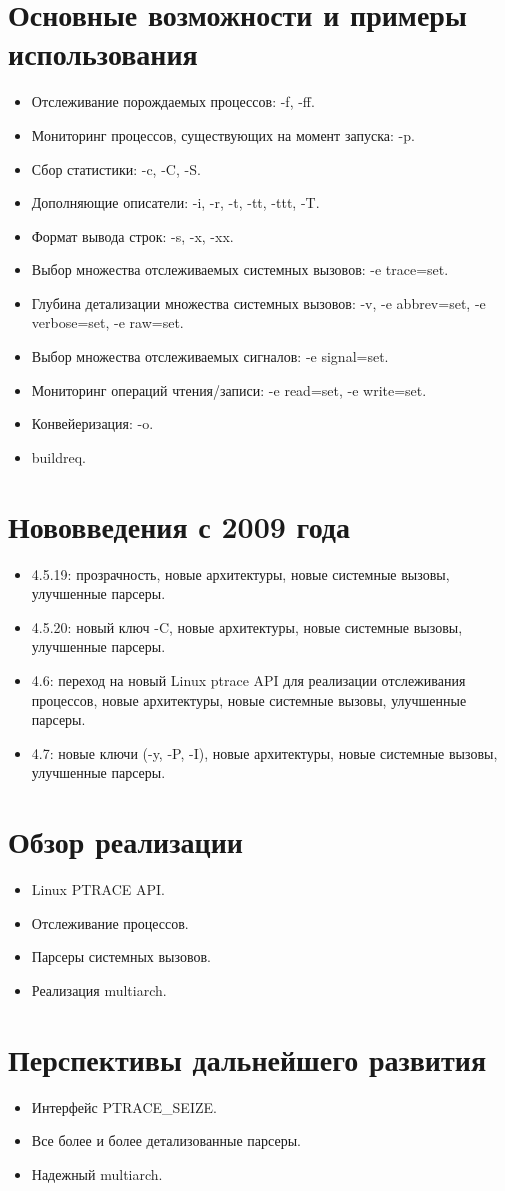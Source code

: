 \section*{Основные возможности и примеры использования}
\begin{itemize}
\item Отслеживание порождаемых процессов: -f, -ff.
\item Мониторинг процессов, существующих на момент запуска: -p.
\item Сбор статистики: -c, -C, -S.
\item Дополняющие описатели: -i, -r, -t, -tt, -ttt, -T.
\item Формат вывода строк: -s, -x, -xx.
\item Выбор множества отслеживаемых системных вызовов: -e trace=set.
\item Глубина детализации множества системных вызовов:
-v, -e abbrev=set, -e verbose=set, -e raw=set.
\item Выбор множества отслеживаемых сигналов: -e signal=set.
\item Мониторинг операций чтения/записи: -e read=set, -e write=set.
\item Конвейеризация: -o.
\item buildreq.
\end{itemize}

\section*{Нововведения с 2009 года}
\begin{itemize}
\item 4.5.19: прозрачность, новые архитектуры, новые системные вызовы, улучшенные парсеры.
\item 4.5.20: новый ключ -C, новые архитектуры, новые системные вызовы, улучшенные парсеры.
\item 4.6: переход на новый Linux ptrace API для реализации отслеживания процессов,
новые архитектуры, новые системные вызовы, улучшенные парсеры.
\item 4.7: новые ключи (-y, -P, -I), новые архитектуры, новые системные вызовы, улучшенные парсеры.
\end{itemize}

\section*{Обзор реализации}
\begin{itemize}
\item Linux PTRACE API.
\item Отслеживание процессов.
\item Парсеры системных вызовов.
\item Реализация multiarch.
\end{itemize}

\section*{Перспективы дальнейшего развития}
\begin{itemize}
\item Интерфейс PTRACE\_SEIZE.
\item Все более и более детализованные парсеры.
\item Надежный multiarch.
\end{itemize}
